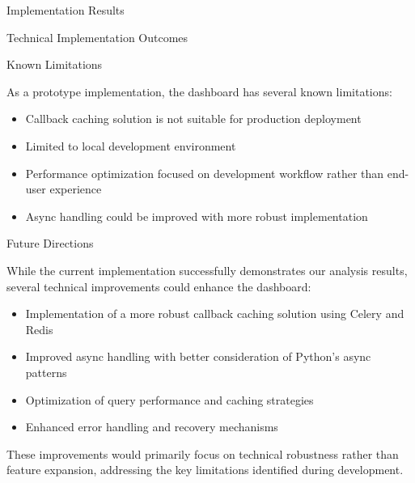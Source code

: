 \begin{section}{Implementation Results}
\begin{subsection}{Technical Implementation Outcomes}
	\end{subsection}

	\begin{subsection}{Known Limitations}
		\label{subsec:implementation-results-limitations}

		As a prototype implementation, the dashboard has several known limitations:

		\begin{itemize}
			\item Callback caching solution is not suitable for production deployment
			\item Limited to local development environment
			\item Performance optimization focused on development workflow rather than end-user experience
			\item Async handling could be improved with more robust implementation
		\end{itemize}

	\end{subsection}
\end{section}

\begin{section}{Future Directions}
	\label{sec:implementation-future-directions}

	While the current implementation successfully demonstrates our analysis results, several technical improvements could enhance the dashboard:

	\begin{itemize}
		\item Implementation of a more robust callback caching solution using Celery and Redis
		\item Improved async handling with better consideration of Python's async patterns
		\item Optimization of query performance and caching strategies
		\item Enhanced error handling and recovery mechanisms
	\end{itemize}

	These improvements would primarily focus on technical robustness rather than feature expansion, addressing the key limitations identified during development.

\end{section}
